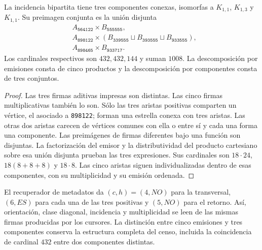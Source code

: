 \begin{theorem}
La incidencia bipartita tiene tres componentes conexas, isomorfas a
$K_{1,1}$, $K_{1,3}$ y $K_{1,1}$. Su preimagen conjunta es la unión
disjunta
\begin{align*}
 &A_{\texttt{564122}}\times B_{\texttt{555555}},\\
 &A_{\texttt{898122}}\times
  (B_{\texttt{339555}}\sqcup B_{\texttt{393555}}
     \sqcup B_{\texttt{933555}}),\\
 &A_{\texttt{898465}}\times B_{\texttt{933717}}.
\end{align*}
Los cardinales respectivos son $432,432,144$ y suman $1008$.
La descomposición por emisiones consta de cinco productos y la
descomposición por componentes consta de tres conjuntos.
\end{theorem}
\begin{proof}
Las tres firmas aditivas impresas son distintas. Las cinco firmas
multiplicativas también lo son. Sólo las tres aristas positivas comparten
un vértice, el asociado a \texttt{898122}; forman una estrella conexa
con tres aristas. Las otras dos aristas carecen de vértices comunes con
ella o entre sí y cada una forma una componente. Las preimágenes de
firmas diferentes bajo una función son disjuntas. La factorización del
emisor y la distributividad del producto cartesiano sobre esa unión
disjunta prueban las tres expresiones. Sus cardinales son
$18\cdot24$, $18(8+8+8)$ y $18\cdot8$. Las cinco aristas siguen
individualizadas dentro de esas componentes, con su multiplicidad y su
emisión ordenada.
\end{proof}

El recuperador de metadatos da $(c,h)=(4,NO)$ para la transversal,
$(6,ES)$ para cada una de las tres positivas y $(5,NO)$ para el retorno.
Así, orientación, clase diagonal, incidencia y multiplicidad se leen de
las mismas firmas producidas por los cursores. La distinción entre cinco
emisiones y tres componentes conserva la estructura completa del censo,
incluida la coincidencia de cardinal $432$ entre dos componentes distintas.
